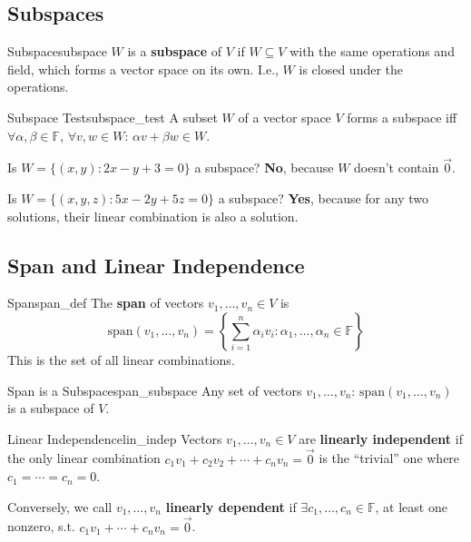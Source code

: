 \documentclass[11pt, letterpaper, openany]{book}
\begin{document}
\subsection{Subspaces}

\begin{defn}{Subspace}{subspace}
$W$ is a \textbf{subspace} of $V$ if $W \subseteq V$ with the same operations and field, which forms a vector space on its own. I.e., $W$ is closed under the operations.
\end{defn}

\begin{lem}{Subspace Test}{subspace_test}
A subset $W$ of a vector space $V$ forms a subspace iff $\forall \alpha, \beta \in \mathbb{F}$, $\forall v, w \in W$: $\alpha v + \beta w \in W$.
\end{lem}

\begin{example}
Is $W = \{(x,y) : 2x - y + 3 = 0\}$ a subspace? \textbf{No}, because $W$ doesn't contain $\vec{0}$.

Is $W = \{(x,y,z) : 5x - 2y + 5z = 0\}$ a subspace? \textbf{Yes}, because for any two solutions, their linear combination is also a solution.
\end{example}

\subsection{Span and Linear Independence}

\begin{defn}{Span}{span_def}
The \textbf{span} of vectors $v_1, \ldots, v_n \in V$ is
\[\text{span}(v_1, \ldots, v_n) = \left\{\sum_{i=1}^n \alpha_i v_i : \alpha_1, \ldots, \alpha_n \in \mathbb{F}\right\}\]
This is the set of all linear combinations.
\end{defn}

\begin{lem}{Span is a Subspace}{span_subspace}
Any set of vectors $v_1, \ldots, v_n$: $\text{span}(v_1, \ldots, v_n)$ is a subspace of $V$.
\end{lem}

\begin{defn}{Linear Independence}{lin_indep}
Vectors $v_1, \ldots, v_n \in V$ are \textbf{linearly independent} if the only linear combination $c_1 v_1 + c_2 v_2 + \cdots + c_n v_n = \vec{0}$ is the ``trivial'' one where $c_1 = \cdots = c_n = 0$.

Conversely, we call $v_1, \ldots, v_n$ \textbf{linearly dependent} if $\exists c_1, \ldots, c_n \in \mathbb{F}$, at least one nonzero, s.t. $c_1 v_1 + \cdots + c_n v_n = \vec{0}$.
\end{defn}
\end{document}
